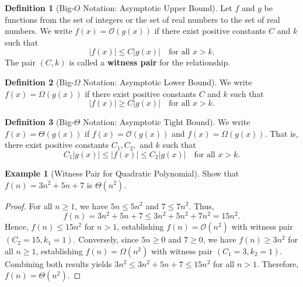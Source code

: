 \documentclass[11pt,a4paper,oneside]{report}
\theoremstyle{definition}
\newtheorem{definition}{Definition}[chapter]
\newtheorem{example}{Example}[chapter]
\begin{document}
\begin{definition}[Big-$O$ Notation: Asymptotic Upper Bound]
Let $f$ and $g$ be functions from the set of integers or the set of real numbers to the set of real numbers. We write $f(x) = \mathcal{O}(g(x))$ if there exist positive constants $C$ and $k$ such that
\begin{equation}
    |f(x)| \le C |g(x)| \quad \text{for all } x > k.
\end{equation}
The pair $(C, k)$ is called a \textbf{witness pair} for the relationship.
\end{definition}

\begin{definition}[Big-$\Omega$ Notation: Asymptotic Lower Bound]
We write $f(x) = \Omega(g(x))$ if there exist positive constants $C$ and $k$ such that
\begin{equation}
    |f(x)| \ge C |g(x)| \quad \text{for all } x > k.
\end{equation}
\end{definition}

\begin{definition}[Big-$\Theta$ Notation: Asymptotic Tight Bound]
We write $f(x) = \Theta(g(x))$ if $f(x) = \mathcal{O}(g(x))$ and $f(x) = \Omega(g(x))$. That is, there exist positive constants $C_1, C_2,$ and $k$ such that
\begin{equation}
    C_1 |g(x)| \le |f(x)| \le C_2 |g(x)| \quad \text{for all } x > k.
\end{equation}
\end{definition}

\begin{example}[Witness Pair for Quadratic Polynomial]
Show that $f(n) = 3n^2 + 5n + 7$ is $\Theta(n^2)$.
\begin{proof}
For all $n \ge 1$, we have $5n \le 5n^2$ and $7 \le 7n^2$. Thus,
\begin{equation}
    f(n) = 3n^2 + 5n + 7 \le 3n^2 + 5n^2 + 7n^2 = 15n^2.
\end{equation}
Hence, $f(n) \le 15n^2$ for $n > 1$, establishing $f(n) = \mathcal{O}(n^2)$ with witness pair $(C_2 = 15, k_1 = 1)$.
Conversely, since $5n \ge 0$ and $7 \ge 0$, we have $f(n) \ge 3n^2$ for all $n \ge 1$, establishing $f(n) = \Omega(n^2)$ with witness pair $(C_1 = 3, k_2 = 1)$.
Combining both results yields $3n^2 \le 3n^2 + 5n + 7 \le 15n^2$ for all $n > 1$. Therefore, $f(n) = \Theta(n^2)$.
\end{proof}
\end{example}
\end{document}
